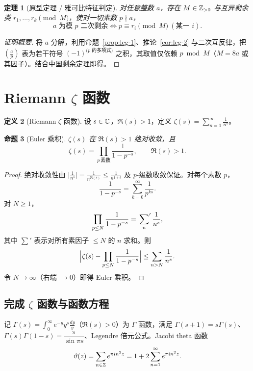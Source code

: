 \documentclass{article}
\newcommand{\leg}[2]{\left(\frac{#1}{#2}\right)}
\theoremstyle{plain}
\newtheorem{thm}{定理}[section]
\newtheorem{prop}[thm]{命题}
\theoremstyle{definition}
\newtheorem{defn}[thm]{定义}
\theoremstyle{remark}
\begin{document}
\begin{thm}[原型定理 / 雅可比特征判定]\label{thm:prototype}
  对任意整数 $a$，存在 $M\in\mathbb{Z}_{>0}$ 与互异剩余类 $r_1,\dots,r_k\pmod M$，使对一切素数 $p\nmid a$，
  \[
    a\text{ 为模 }p\text{ 二次剩余}\iff p\equiv r_i\pmod M\ (\text{某一 }i).
  \]
\end{thm}

\begin{proof}[证明概要]
  将 $a$ 分解，利用命题~\ref{prop:leg-1}、推论~\ref{cor:leg-2} 与二次互反律，把 $\leg{a}{p}$ 表为若干符号 $(-1)^{\text{($p$ 的多项式)}}$ 之积，其取值仅依赖 $p\bmod M$（$M=8a$ 或其因子）。结合中国剩余定理即得。
\end{proof}

\section{Riemann $\zeta$ 函数}\label{sec:zeta}

\begin{defn}[Riemann $\zeta$ 函数]
  设 $s\in\mathbb{C}$，$\Re(s)>1$，定义 $\displaystyle\zeta(s)=\sum_{n=1}^\infty\frac1{n^s}$。
\end{defn}

\begin{prop}[Euler 乘积]\label{prop:euler-prod-zeta}
  $\zeta(s)$ 在 $\Re(s)>1$ 绝对收敛，且
  \[
    \zeta(s)=\prod_{p\ \text{素数}}\frac1{1-p^{-s}},\qquad \Re(s)>1.
  \]
\end{prop}

\begin{proof}
  绝对收敛性由 $\bigl|\frac1{n^s}\bigr|=\frac1{n^{\Re(s)}}\le\frac1{n^{1+\delta}}$ 及 $p$-级数收敛保证。对每个素数 $p$，
  \[
    \frac1{1-p^{-s}}=\sum_{k=0}^\infty\frac1{p^{ks}}.
  \]
  对 $N\ge1$，
  \[
    \prod_{p\le N}\frac1{1-p^{-s}}=\sideset{}{'}\sum_n\frac1{n^s},
  \]
  其中 $\sum'$ 表示对所有素因子 $\le N$ 的 $n$ 求和。则
  \[
    \Bigl|\zeta(s)-\prod_{p\le N}\frac1{1-p^{-s}}\Bigr|\le\sum_{n>N}\frac1{n^s}.
  \]
  令 $N\to\infty$（右端 $\to0$）即得 Euler 乘积。
\end{proof}

\subsection{完成 $\zeta$ 函数与函数方程}

记 $\Gamma(s)=\int_0^\infty e^{-y}y^s\frac{dy}{y}$（$\Re(s)>0$）为 $\Gamma$ 函数，满足 $\Gamma(s+1)=s\Gamma(s)$、$\Gamma(s)\Gamma(1-s)=\dfrac{\pi}{\sin\pi s}$、Legendre 倍元公式。Jacobi theta 函数
\[
  \vartheta(z)=\sum_{n\in\mathbb{Z}}e^{\pi i n^2 z}=1+2\sum_{n=1}^\infty e^{\pi i n^2 z}.
\]
\end{document}
